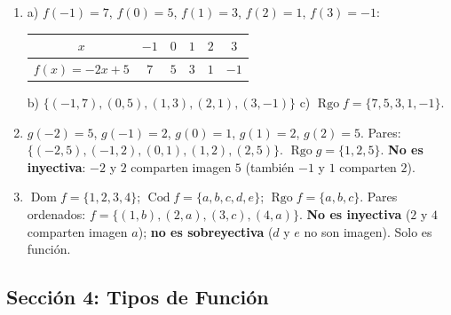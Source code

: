 \documentclass[12pt, letterpaper]{article}
\newcommand{\Dom}{\operatorname{Dom}}
\newcommand{\Cod}{\operatorname{Cod}}
\newcommand{\Rgo}{\operatorname{Rgo}}
\begin{document}
  \begin{enumerate}[leftmargin=*, label=\textbf{\arabic*.}]
    \item a) $f(-1) = 7$, $f(0) = 5$, $f(1) = 3$, $f(2) = 1$, $f(3) = -1$:
          \begin{center}
            \begin{tabular}{c|ccccc}
              \toprule
              $x$             & $-1$ & $0$ & $1$ & $2$ & $3$ \\
              \midrule
              $f(x) = -2x+5$  & $7$  & $5$ & $3$ & $1$ & $-1$ \\
              \bottomrule
            \end{tabular}
          \end{center}
          b) $\{(-1,7), (0,5), (1,3), (2,1), (3,-1)\}$ \quad
          c) $\Rgo f = \{7, 5, 3, 1, -1\}$.

    \item $g(-2) = 5$, $g(-1) = 2$, $g(0) = 1$, $g(1) = 2$, $g(2) = 5$.
          Pares: $\{(-2,5), (-1,2), (0,1), (1,2), (2,5)\}$. \quad $\Rgo g = \{1, 2, 5\}$.
          \textbf{No es inyectiva}: $-2$ y $2$ comparten imagen $5$ (también $-1$ y $1$ comparten $2$).

    \item $\Dom f = \{1,2,3,4\}$; \quad $\Cod f = \{a,b,c,d,e\}$; \quad $\Rgo f = \{a,b,c\}$.
          Pares ordenados: $f = \{(1,b), (2,a), (3,c), (4,a)\}$.
          \textbf{No es inyectiva} ($2$ y $4$ comparten imagen $a$); \textbf{no es sobreyectiva} ($d$ y $e$ no son imagen). Solo es función.
  \end{enumerate}

  \newpage

  \subsection*{Sección 4: Tipos de Función}
\end{document}
